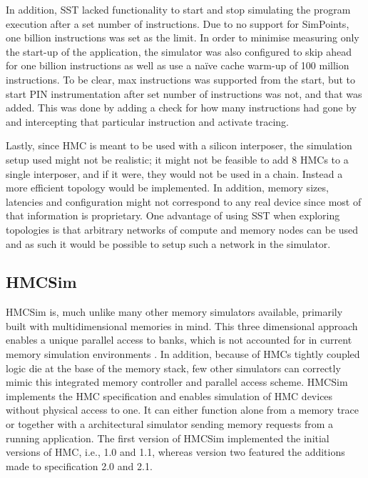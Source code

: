 In addition, SST lacked functionality to start and stop simulating the program execution after a set number of instructions. Due to no support for SimPoints, one billion instructions was set as the limit. In order to minimise measuring only the start-up of the application, the simulator was also configured to skip ahead for one billion instructions as well as use a naïve cache warm-up of 100 million instructions. To be clear, max instructions was supported from the start, but to start PIN instrumentation after set number of instructions was not, and that was added. This was done by adding a check for how many instructions had gone by and intercepting that particular instruction and activate tracing.
\bigskip

Lastly, since HMC is meant to be used with a silicon interposer, the simulation setup used might not be realistic; it might not be feasible to add 8 HMCs to a single interposer, and if it were, they would not be used in a chain. Instead a more efficient topology would be implemented. In addition, memory sizes, latencies and configuration might not correspond to any real device since most of that information is proprietary. One advantage of using SST when exploring topologies is that arbitrary networks of compute and memory nodes can be used and as such it would be possible to setup such a network in the simulator.




\subsection{HMCSim} \label{HMC-Sim}
HMCSim is, much unlike many other memory simulators available, primarily built with multidimensional memories in mind. This three dimensional approach enables a unique parallel access to banks, which is not accounted for in current memory simulation environments \cite{6969550}. In addition, because of HMCs tightly coupled logic die at the base of the memory stack, few other simulators can correctly mimic this integrated memory controller and parallel access scheme. HMCSim implements the HMC specification and enables simulation of HMC devices without physical access to one. It can either function alone from a memory trace or together with a architectural simulator sending memory requests from a running application. The first version of HMCSim implemented the initial versions of HMC, i.e., 1.0 and 1.1, whereas version two featured the additions made to specification 2.0 and 2.1.
\bigskip

